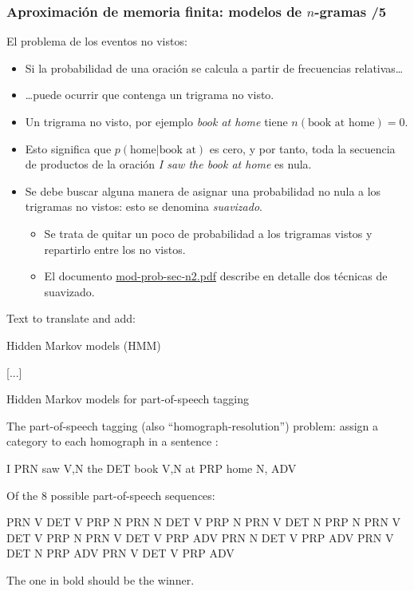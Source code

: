 \begin{frame}
  \frametitle{Aproximación de memoria finita: modelos de \(n\)-gramas /5} 
El problema de los eventos no vistos:
\begin{itemize}
\item Si la probabilidad de una oración se calcula a partir de frecuencias relativas\ldots
\item \ldots puede ocurrir que contenga un trigrama no visto.
\item Un trigrama no visto, por ejemplo \emph{book at home} tiene \(n(\mbox{book at home})=0\).
\item Esto significa que \(p(\mbox{home}|\mbox{book at})\) es cero, y por tanto, toda la secuencia de productos de la oración \emph{I saw the book at home} es nula.
\item Se debe buscar alguna manera de asignar una probabilidad no nula a los trigramas no vistos: esto se denomina \emph{suavizado}.
  \begin{itemize}
  \item Se trata de quitar un poco de probabilidad a los trigramas vistos y repartirlo entre los no vistos.
  \item El documento \url{mod-prob-sec-n2.pdf} describe en detalle dos técnicas de suavizado.
  \end{itemize}
\end{itemize}
\end{frame}














Text to translate and add:


Hidden Markov models (HMM)

[...]

Hidden Markov models for part-of-speech tagging

The part-of-speech tagging (also “homograph-resolution”) problem: assign a category to each homograph in a sentence :

I {PRN}
saw {V,N}
the {DET}
book {V,N}
at {PRP}
home {N, ADV}

Of the 8 possible part-of-speech sequences:

PRN V DET V PRP N
PRN N DET V PRP N
PRN V DET N PRP N
PRN V DET V PRP N
PRN V DET V PRP ADV 
PRN N DET V PRP ADV
PRN V DET N PRP ADV
PRN V DET V PRP ADV

The one in bold should be the winner.

